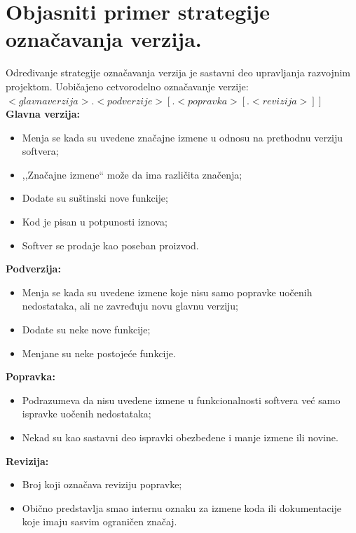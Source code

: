 \documentclass[a4paper]{article}
\begin{document}
\section{Objasniti primer strategije označavanja verzija.}
  Određivanje strategije označavanja verzija je sastavni deo upravljanja razvojnim projektom. 
  Uobičajeno cetvorodelno označavanje verzije:\\
  \indent $<glavna verzija>.<podverzije>[.<popravka>[.<revizija>]]$\\
  \textbf{Glavna verzija:}
  \begin{itemize}
    \item Menja se kada su uvedene značajne izmene u odnosu na prethodnu verziju softvera;
    \item ,,Značajne izmene`` može da ima različita značenja;
    \item Dodate su suštinski nove funkcije;
    \item Kod je pisan u potpunosti iznova;
    \item Softver se prodaje kao poseban proizvod.
  \end{itemize}
  \textbf{Podverzija:}
  \begin{itemize}
    \item Menja se kada su uvedene izmene koje nisu samo popravke uočenih nedostataka, 
          ali ne zavređuju novu glavnu verziju;
    \item Dodate su neke nove funkcije;
    \item Menjane su neke postojeće funkcije.
  \end{itemize}
  \textbf{Popravka:}
  \begin{itemize}
    \item Podrazumeva da nisu uvedene izmene u funkcionalnosti softvera već samo ispravke 
          uočenih nedostataka;
    \item Nekad su kao sastavni deo ispravki obezbeđene i manje izmene ili novine.
  \end{itemize}
  \textbf{Revizija:}
  \begin{itemize}
    \item Broj koji označava reviziju popravke;
    \item Obično predstavlja smao internu oznaku za izmene koda ili dokumentacije koje 
          imaju sasvim ograničen značaj.
  \end{itemize}
  
\end{document}
